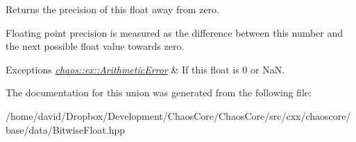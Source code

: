 Returns the precision of this float away from zero. 

Floating point precision is measured as the difference between this number and the next possible float value towards zero.


\begin{DoxyExceptions}{Exceptions}
{\em \hyperlink{classchaos_1_1ex_1_1_arithmetic_error}{chaos\-::ex\-::\-Arithmetic\-Error}} & If this float is 0 or Na\-N. \\
\hline
\end{DoxyExceptions}


The documentation for this union was generated from the following file\-:\begin{DoxyCompactItemize}
\item 
/home/david/\-Dropbox/\-Development/\-Chaos\-Core/\-Chaos\-Core/src/cxx/chaoscore/base/data/Bitwise\-Float.\-hpp\end{DoxyCompactItemize}
